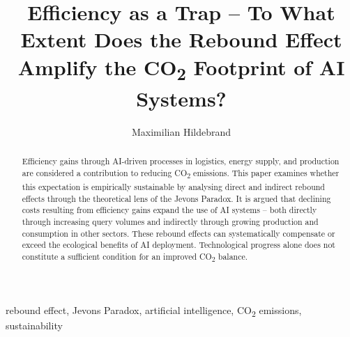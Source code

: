 \documentclass[english]{lni}
\begin{document}
\title[Efficiency as a Trap]{Efficiency as a Trap -- To What
Extent Does the Rebound Effect Amplify the
CO\protect\textsubscript{2} Footprint of AI Systems?}
\author[1]{Maximilian Hildebrand}{}{}
\maketitle

\begin{abstract}
Efficiency gains through AI-driven processes in logistics, energy supply, and production are considered a contribution to reducing CO\textsubscript{2} emissions. This paper examines whether this expectation is empirically sustainable by analysing direct and indirect rebound effects through the theoretical lens of the Jevons Paradox. It is argued that declining costs resulting from efficiency gains expand the use of AI systems -- both directly through increasing query volumes and indirectly through growing production and consumption in other sectors. These rebound effects can systematically compensate or exceed the ecological benefits of AI deployment. Technological progress alone does not constitute a sufficient condition for an improved CO\textsubscript{2} balance.
\end{abstract}
\begin{keywords}
rebound effect, Jevons Paradox, artificial intelligence, CO\textsubscript{2} emissions, sustainability
\end{keywords}








\printbibliography
\end{document}
